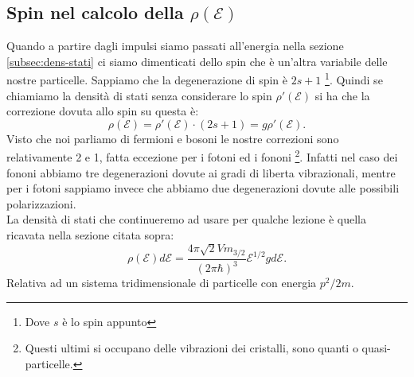 \subsection{Spin nel calcolo della $\rho ( \mathcal{E} ) $}%
Quando a partire dagli impulsi siamo passati all'energia nella sezione \ref{subsec:dens-stati} ci siamo dimenticati dello spin che è un'altra variabile delle nostre particelle. Sappiamo che la degenerazione di spin è $2s+1$ \footnote{Dove $s$ è lo spin appunto}. Quindi se chiamiamo la densità di stati senza considerare lo spin $\rho '( \mathcal{E} ) $ si ha che la correzione dovuta allo spin su questa è: 
\[
	\rho ( \mathcal{E} ) = \rho'( \mathcal{E} ) \cdot  \left( 2s + 1 \right)   = g \rho '( \mathcal{E} ) 
.\] 
Visto che noi parliamo di fermioni e bosoni le nostre correzioni sono relativamente 2 e 1, fatta eccezione per i fotoni ed i fononi \footnote{Questi ultimi si occupano delle vibrazioni dei cristalli, sono quanti o quasi-particelle.}.
Infatti nel caso dei fononi abbiamo tre degenerazioni dovute ai gradi di liberta vibrazionali, mentre per i fotoni sappiamo invece che abbiamo due degenerazioni dovute alle possibili polarizzazioni.\\
La densità di stati che continueremo ad usare per qualche lezione è quella ricavata nella sezione citata sopra:
\[
	\rho ( \mathcal{E} ) d\mathcal{E} = \frac{4\pi\sqrt{2} V m_{3 /2}}{\left( 2\pi \hbar \right)^3 } \mathcal{E} ^{1 /2} g d\mathcal{E} \label{eq:densita-stati}
.\] 
Relativa ad un sistema tridimensionale di particelle con energia $p^2/2m$.

